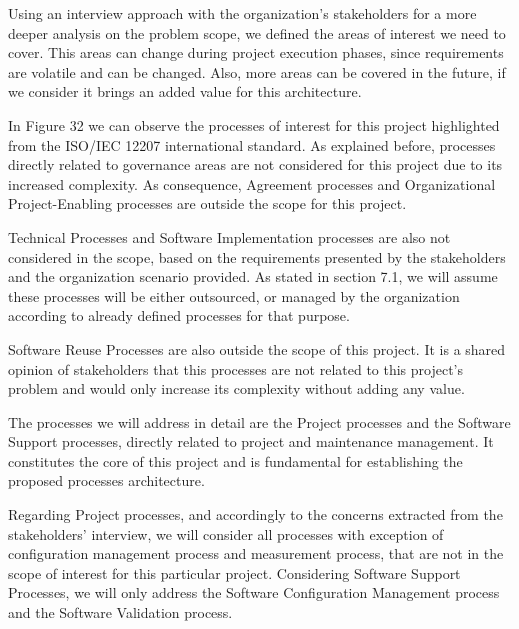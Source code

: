 Using an interview approach with the organization's stakeholders for a more deeper analysis on the problem scope, we defined the areas of interest we need to cover. This areas can change during project execution phases, since requirements are volatile and can be changed. Also, more areas can be covered in the future, if we consider it brings an added value for this architecture.\par
In Figure 32 we can observe the processes of interest for this project highlighted from the ISO/IEC 12207 international standard. As explained before, processes directly related to governance areas are not considered for this project due to its increased complexity. As consequence, Agreement processes and Organizational Project-Enabling processes are outside the scope for this project.\par
Technical Processes and Software Implementation processes are also not considered in the scope, based on the requirements presented by the stakeholders and the organization scenario provided. As stated in section 7.1, we will assume these processes will be either outsourced, or managed by the organization according to already defined processes for that purpose.\par
Software Reuse Processes are also outside the scope of this project. It is a shared opinion of stakeholders that this processes are not related to this project's problem and would only increase its complexity without adding any value.\par
The processes we will address in detail are the Project processes and the Software Support processes, directly related to project and maintenance management. It constitutes the core of this project and is fundamental for establishing the proposed processes architecture.\par
Regarding Project processes, and accordingly to the concerns extracted from the stakeholders' interview, we will consider all processes with exception of configuration management process and measurement process, that are not in the scope of interest for this particular project. Considering Software Support Processes, we will only address the Software Configuration Management process and the Software Validation process.\par


